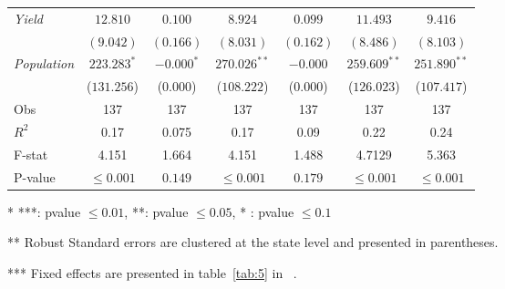 \documentclass [12pt]{article}
\begin{document}
\begin{table}[htbp]
\begin{tabular}{lcccccc}
    \textit{Yield}  & $12.810$ & $0.100$ & $8.924$ & $0.099$ & $11.493$ & $ 9.416$ \\
                    & $(9.042)$ & $(0.166)$ & $(8.031)$ & $(0.162)$ & $(8.486)$ &  $(8.103)$\\
    \textit{Population} & $223.283^{*}$ & $-0.000^{*}$ & $ 270.026^{**}$ & $-0.000$ & $259.609^{**}$ & $251.890^{**}$ \\
                        & ($131.256$) & ($0.000$) & ($108.222$) & ($0.000$) & ($126.023$) & ($107.417$) \\
    \bottomrule
    Obs & 137 & 137 & 137 & 137 & 137 & 137 \\
    $R^{2}$ & 0.17 & 0.075 & 0.17 & 0.09 & 0.22 & 0.24 \\
    F-stat & 4.151 & 1.664 & 4.151 & 1.488 &  4.7129 & 5.363 \\
    P-value & $\leq 0.001$ & $0.149$ & $\leq 0.001$ & $0.179$ & $\leq 0.001$ & $\leq 0.001$ \\
    \bottomrule
    \bottomrule
\end{tabular}
    \label{tab:results}
    \begin{tablenotes}[flushleft] 
        \smaller
        \item[*] ***: pvalue $\leq 0.01$, **: pvalue $\leq 0.05$, * : pvalue $\leq 0.1$ 
        \vspace{0.1cm}
        \item[**] Robust Standard errors are clustered at the state level and presented in parentheses.
        \item[***] Fixed effects are presented in table~\ref{tab:5} in ~.

    \end{tablenotes}
\end{table}
\end{document}
